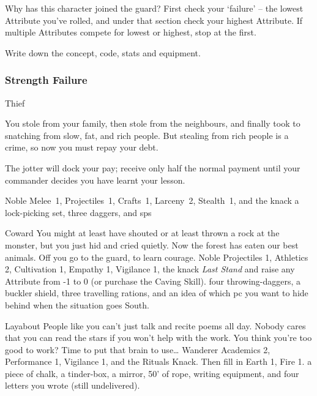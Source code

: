 \begin{multicols}{2}

\noindent
Why has this character joined the \gls{guard}?
First check your `failure' -- the lowest Attribute you've rolled, and under that section check your highest Attribute.
If multiple Attributes compete for lowest or highest, stop at the first.

Write down the concept, code, stats and equipment.

\subsubsection{Strength Failure}

\begin{itemize}

    {Thief}%
    {
      You stole from your family, then stole from the neighbours, and finally took to snatching from slow, fat, and rich people.
      But stealing from rich people is a crime, so now you must repay your debt.

      The \gls{jotter} will dock your pay; receive only half the normal payment until your commander decides you have learnt your lesson.

    }%
    {Noble}%
    {Melee~1, Projectiles~1, Crafts~1, Larceny~2, Stealth~1, and the knack }%
    {a lock-picking set, three daggers, and  \glspl{sp}}%

    {Coward}%
    {
      You might at least have shouted or at least thrown a rock at the \gls{monster}, but you just hid and cried quietly.
      Now the forest has eaten our best animals.
      Off you go to the \gls{guard}, to learn courage.
    }%
    {Noble}%
    {
      Projectiles 1, Athletics 2, Cultivation 1, Empathy 1, Vigilance 1, the knack \textit{Last Stand} and raise any Attribute from -1 to 0 (or purchase the Caving Skill).
    }%
    {
      four throwing-daggers, a buckler shield, three travelling rations, and an idea of which \gls{pc} you want to hide behind when the situation goes South.
    }%


    {Layabout}%
    {
      People like you can't just talk and recite poems all day.
      Nobody cares that you can read the stars if you won't help with the work.
      You think you're too good to work?
      Time to put that brain to use\ldots
    }%
    {Wanderer}%
    {%
      Academics 2, Performance 1, Vigilance 1, and the Rituals Knack.
    Then fill in Earth 1, Fire 1.
    }%
    {
      a piece of chalk, a tinder-box, a mirror, 50' of rope, writing equipment, and four letters you wrote (still undelivered).
    }%


\end{itemize}
\end{multicols}
